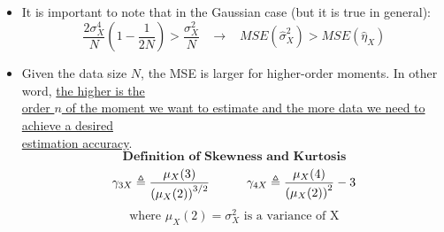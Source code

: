 \begin{itemize}
\item It is important to note that in the Gaussian case (but it is true in general):
\[
\frac{2\sigma_X^4}{N} \left(1 - \frac{1}{2N}\right) > \frac{\sigma_X^2}{N}
\;\;\; \rightarrow \;\;\;
MSE\left(\hat{\sigma}_X^2\right) > MSE\left(\hat{\eta}_X\right)
\]
\item Given the data size \(N\), the MSE is larger for higher-order moments. In other word, \underline{the higher is the }\\
\noindent \underline{order \(n\) of the moment we want to estimate and the more data we need to achieve a desired} \\ 
\noindent \underline{estimation accuracy}.
\newpage
\[
\textbf{Definition of Skewness and Kurtosis}
\]
\vspace{0.5em}
\[
\gamma_{3X} \triangleq \frac{\mu_X(3)}{\left( \mu_X(2) \right)^{3/2}} \hspace*{3em} \gamma_{4X} \triangleq \frac{\mu_X(4)}{\left( \mu_X(2) \right)^{2}} - 3
\]
\vspace{0.5em}
\[
\text{where } \mu_X(2)=\sigma_X^2\text{ is a variance of X}
\]


\end{itemize}
